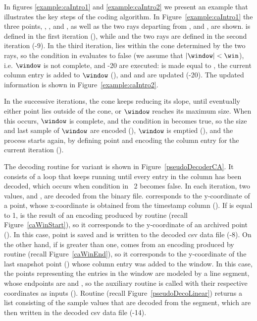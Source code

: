 In figures \ref{example:caIntro1} and \ref{example:caIntro2} we present an example that illustrates the key steps of the coding algorithm. In Figure~\ref{example:caIntro1} the three points, \archived, \snapshot, and \incoming, as well as the two rays departing from \archived, \smin and \smax, are shown. \archived is defined in the first iteration (), while \snapshot and the two rays are defined in the second iteration (-9). In the third iteration, \incoming lies within the cone determined by the two rays, so the condition in  evaluates to false (we assume that $|\window|<\win$), i.e. $\window$ is not complete, and -20 are executed: \snapshot is made equal to \incoming, the current column entry is added to $\window$ (), and \smin and \smax are updated (-20). The updated information is shown in Figure~\ref{example:caIntro2}. 


\exampleCA


\clearpage


In the successive iterations, the cone keeps reducing its slope, until eventually either point \incoming lies outside of the cone, or $\window$ reaches its maximum size. When this occurs, $\window$ is complete, and the condition in  becomes true, so the size and last sample of $\window$ are encoded (), $\window$ is emptied (), and the process starts again, by defining point \archived and encoding the column entry for the current iteration ().


The decoding routine for variant \maskalgo is shown in Figure~\ref{pseudoDecoderCA}. It consists of a loop that keeps running until every entry in the column has been decoded, which occurs when condition in \Line~2 becomes false. In each iteration, two values, \sizee and , are decoded from the binary file.  corresponds to the y-coordinate of a point, whose x-coordinate is obtained from the timestamp column (). If \sizee is equal to 1,  is the result of an encoding produced by routine \CAWinStart (recall Figure~\ref{caWinStart}), so it corresponds to the y-coordinate of an archived point (\archived). In this case, point \archived is saved and  is written to the decoded csv data file (-8). On the other hand, if \sizee is greater than one,  comes from an encoding produced by routine \CAWinEnd (recall Figure~\ref{caWinEnd}), so it corresponds to the y-coordinate of the last snapshot point (\snapshot) whose column entry was added to the window. In this case, the points representing the entries in the window are modeled by a line segment, whose endpoints are \archived and \snapshot, so the auxiliary routine \decodeSegment is called with their respective coordinates as inputs (). Routine \decodeSegment (recall Figure~\ref{pseudoDecoLinear}) returns a list consisting of the sample values that are decoded from the segment, which are then written in the decoded csv data file (-14).


